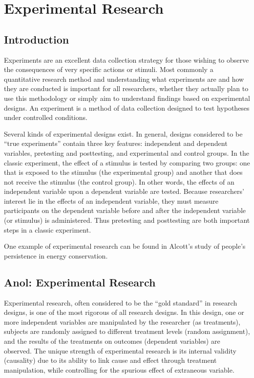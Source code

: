 \chapter{Experimental Research}\label{ch09:experimental_research}

\section{Introduction}

Experiments are an excellent data collection strategy for those wishing to observe the consequences of very specific actions or stimuli. Most commonly a quantitative research method and understanding what experiments are and how they are conducted is important for all researchers, whether they actually plan to use this methodology or simply aim to understand findings based on experimental designs. An experiment is a method of data collection designed to test hypotheses under controlled conditions. 

Several kinds of experimental designs exist. In general, designs considered to be ``true experiments'' contain three key features: independent and dependent variables, pretesting and posttesting, and experimental and control groups. In the classic experiment, the effect of a stimulus is tested by comparing two groups: one that is exposed to the stimulus (the experimental group) and another that does not receive the stimulus (the control group). In other words, the effects of an independent variable upon a dependent variable are tested. Because researchers' interest lie in the effects of an independent variable, they must measure participants on the dependent variable before and after the independent variable (or stimulus) is administered. Thus pretesting and posttesting are both important steps in a classic experiment.

One example of experimental research can be found in Alcott's study of people's persistence in energy conservation\cite{allcott2014short}. 

\section{Anol: Experimental Research}

Experimental research, often considered to be the “gold standard” in research designs, is one of the most rigorous of all research designs. In this design, one or more independent variables are manipulated by the researcher (as treatments), subjects are randomly assigned to different treatment levels (random assignment), and the results of the treatments on outcomes (dependent variables) are observed. The unique strength of experimental research is its internal validity (causality) due to its ability to link cause and effect through treatment manipulation, while controlling for the spurious effect of extraneous variable.

